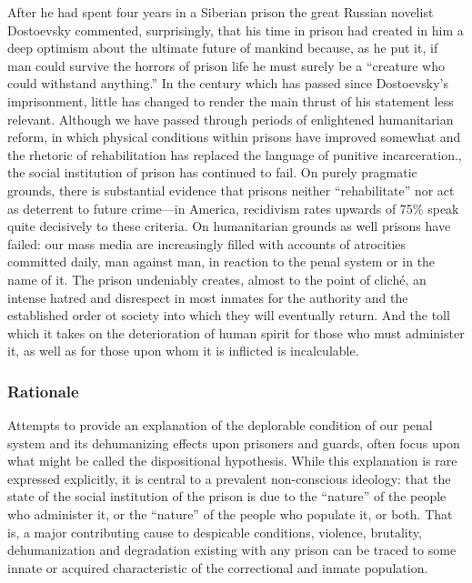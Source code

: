 After he had spent four years in a Siberian prison the great Russian novelist Dostoevsky commented, surprisingly, that his time in prison had created in him a deep optimism about the ultimate future of mankind because, as he put it, if man could survive the horrors of prison life he must surely be a “creature who could withstand anything.” In the century which has passed since Dostoevsky’s imprisonment, little has changed to render the main thrust of his statement less relevant. Although we have passed through periods of enlightened humanitarian reform, in which physical conditions within prisons have improved somewhat and the rhetoric of rehabilitation has replaced the language of punitive incarceration., the social institution of prison has continued to fail. On purely pragmatic grounds, there is substantial evidence that prisons neither “rehabilitate” nor act as deterrent to future crime—in America, recidivism rates upwards of 75\% speak quite decisively to these criteria. On humanitarian grounds as well prisons have failed: our mass media are increasingly filled with accounts of atrocities committed daily, man against man, in reaction to the penal system or in the name of it. The prison undeniably creates, almost to the point of cliché, an intense hatred and disrespect in most inmates for the authority and the established order ot society into which they will eventually return. And the toll which it takes on the deterioration of human spirit for those who must administer it, as well as for those upon whom it is inflicted is incalculable.

\subsubsection{Rationale}
\label{rationale}

Attempts to provide an explanation of the deplorable condition of our penal system and its dehumanizing effects upon prisoners and guards, often focus upon what might be called the dispositional hypothesis. While this explanation is rare expressed explicitly, it is central to a prevalent non-conscious ideology: that the state of the social institution of the prison is due to the “nature” of the people who administer it, or the “nature” of the people who populate it, or both. That is, a major contributing cause to despicable conditions, violence, brutality, dehumanization and degradation existing with any prison can be traced to some innate or acquired characteristic of the correctional and inmate population.

